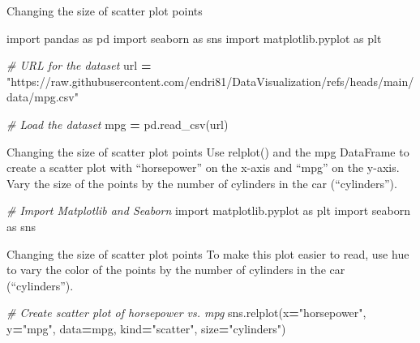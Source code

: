 \documentclass[
  ignorenonframetext,
]{beamer}
\newenvironment{Shaded}{\begin{snugshade}}{\end{snugshade}}
\newcommand{\CommentTok}[1]{\textcolor[rgb]{0.56,0.35,0.01}{\textit{#1}}}
\newcommand{\ImportTok}[1]{#1}
\newcommand{\NormalTok}[1]{#1}
\newcommand{\OperatorTok}[1]{\textcolor[rgb]{0.81,0.36,0.00}{\textbf{#1}}}
\newcommand{\StringTok}[1]{\textcolor[rgb]{0.31,0.60,0.02}{#1}}
\begin{document}
\begin{frame}[fragile]{Changing the size of scatter plot points}
\label{changing-the-size-of-scatter-plot-points-3}

\begin{Shaded}
\begin{Highlighting}[]
\ImportTok{import}\NormalTok{ pandas }\ImportTok{as}\NormalTok{ pd}
\ImportTok{import}\NormalTok{ seaborn }\ImportTok{as}\NormalTok{ sns}
\ImportTok{import}\NormalTok{ matplotlib.pyplot }\ImportTok{as}\NormalTok{ plt}

\CommentTok{\# URL for the dataset}
\NormalTok{url }\OperatorTok{=} \StringTok{"https://raw.githubusercontent.com/endri81/DataVisualization/refs/heads/main/data/mpg.csv"}

\CommentTok{\# Load the dataset}
\NormalTok{mpg }\OperatorTok{=}\NormalTok{ pd.read\_csv(url)}
\end{Highlighting}
\end{Shaded}
\end{frame}

\begin{frame}[fragile]{Changing the size of scatter plot points}
\label{changing-the-size-of-scatter-plot-points-4}
Use relplot() and the mpg DataFrame to create a scatter plot with
``horsepower'' on the x-axis and ``mpg'' on the y-axis. Vary the size of
the points by the number of cylinders in the car (``cylinders'').


\begin{Shaded}
\begin{Highlighting}[]
\CommentTok{\# Import Matplotlib and Seaborn}
\ImportTok{import}\NormalTok{ matplotlib.pyplot }\ImportTok{as}\NormalTok{ plt}
\ImportTok{import}\NormalTok{ seaborn }\ImportTok{as}\NormalTok{ sns}
\end{Highlighting}
\end{Shaded}
\end{frame}

\begin{frame}[fragile]{Changing the size of scatter plot points}
\label{changing-the-size-of-scatter-plot-points-5}
To make this plot easier to read, use hue to vary the color of the
points by the number of cylinders in the car (``cylinders'').


\begin{Shaded}
\begin{Highlighting}[]
\CommentTok{\# Create scatter plot of horsepower vs. mpg}
\NormalTok{sns.relplot(x}\OperatorTok{=}\StringTok{"horsepower"}\NormalTok{, y}\OperatorTok{=}\StringTok{"mpg"}\NormalTok{, }
\NormalTok{            data}\OperatorTok{=}\NormalTok{mpg, kind}\OperatorTok{=}\StringTok{"scatter"}\NormalTok{, }
\NormalTok{            size}\OperatorTok{=}\StringTok{"cylinders"}\NormalTok{)}
\end{Highlighting}
\end{Shaded}
\end{frame}
\end{document}
